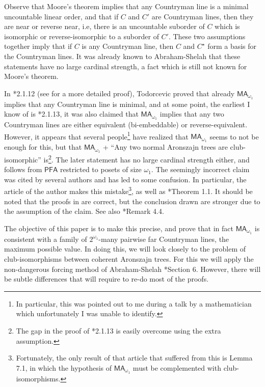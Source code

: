 \documentclass[10pt,a4paper]{amsart}
\theoremstyle{definition}
\newcommand{\PFA}{\textsf{PFA}}
\newcommand{\MA}{\textsf{MA}}
\newcommand{\1}{\mathbf{1}}
\begin{document}
Observe that Moore's theorem implies that any Countryman line is a
minimal uncountable linear order, and that if $C$ and $C'$ are
Countryman lines, then they are near or reverse near, i.e,
there is an uncountable suborder of $C$ which is isomorphic or
reverse-isomorphic to a suborder of $C'$.
These two assumptions together imply that 
if $C$ is any Countryman line, then $C$ and $C^{\star}$
form a basis for the Countryman lines.
It was already known to Abraham-Shelah \cite{ShelahAbraham} that these
statements have no large cardinal strength, a fact which is still not
known for Moore's theorem.

In \cite{TodorcevicWalks}*{2.1.12}
(see \cite{univ-A-line} for a more detailed proof),
Todorcevic proved that
already $\MA_{\omega_{1}}$ implies that any Countryman line
is minimal, and at some point,
the earliest I know of is \cite{TodorcevicWalks}*{2.1.13}, it was
also claimed that $\MA_{\omega_{1}}$ implies that any two Countryman lines
are either equivalent (bi-embeddable) or reverse-equivalent.
However, it appears that several
people\footnote{In particular, this was pointed out to
  me during a talk by a mathematician which unfortunately
  I was unable to identify.}
have realized that $\MA_{\omega_{1}}$ seems to not be enough for this,
but that
$\MA_{\omega_{1}}$ + ``Any two normal Aronszajn trees are club-isomorphic''
is\footnote{The gap in the proof of \cite{TodorcevicWalks}*{2.1.13} is easily
overcome using the extra assumption.}.
The later statement has no large cardinal strength either,
and follows from $\PFA$ restricted to posets of size $\omega_{1}$.
The seemingly incorrect claim was cited by several authors and has
led to some confusion. In particular, the article of the author
\cite{PMREpi} makes this mistake\footnote{Fortunately, the only
  result of that article that suffered from this is
  Lemma 7.1, in which the hypothesis of $\MA_{\omega_{1}}$ must be complemented
  with club-isomorphisms.}, as well as \cite{univ-A-line}*{Theorem 1.1}.
It should be noted that the proofs in \cite{PMREpi,univ-A-line} are correct,
but the conclusion drawn are stronger due to the assumption of the claim.
See also \cite{MooreTodorcevic}*{Remark 4.4}.

The objective of this paper is to make this precise, and prove that in
fact $\MA_{\omega_{1}}$ is consistent with
a family of $2^{\omega_{1}}$-many pairwise far Countryman lines,
the maximum possible value. In
doing this, we will look closely to the problem of club-isomorphisms
between coherent Aronszajn trees.  For this we will apply
the non-dangerous forcing method of Abraham-Shelah
\cite{ShelahAbraham}*{Section 6}. However, there will be subtle differences
that will require to re-do most of the proofs.
\end{document}
